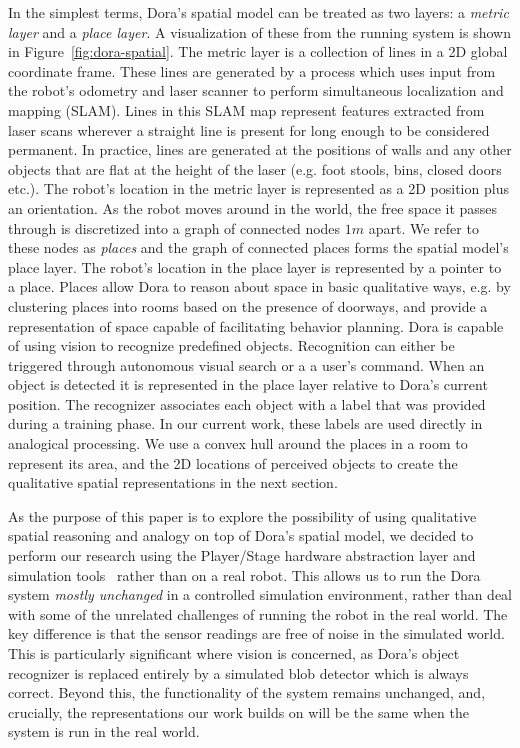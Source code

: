 \documentclass[letterpaper]{article}
\begin{document}
In the simplest terms, Dora's spatial model can be treated as two layers: a \emph{metric layer} and a \emph{place layer}. A visualization of these from the running system is shown in Figure~\ref{fig:dora-spatial}.
The metric layer is a collection of lines in a 2D global coordinate frame. These lines are generated by a  process which uses input from the robot's odometry and laser scanner to perform simultaneous localization and mapping (SLAM). Lines in this SLAM map represent features extracted from laser scans wherever a straight line is present for long enough to be considered permanent. In practice, lines are generated at the positions of walls and any other objects that are flat at the height of the laser (e.g. foot stools, bins, closed doors etc.). The robot's location in the metric layer is represented as a 2D position plus an orientation.
As the robot moves around in the world, the free space it passes through is discretized into a graph of connected nodes $1m$ apart. We refer to these nodes as \emph{places} and the graph of connected places forms the spatial model's place layer. The robot's location in the place layer is represented by a pointer to a place. Places allow Dora to reason about space in basic qualitative ways, e.g. by clustering places into rooms based on the presence of doorways, and provide a representation of space capable of facilitating behavior planning.
Dora is capable of using vision to recognize predefined objects. Recognition can either be triggered through autonomous visual search or a a user's command. When an object is detected it is represented in the place layer relative to Dora's current position. The recognizer associates each object with a label that was provided during a training phase. In our current work, these labels are used directly in analogical processing. We use a convex hull around the places in a room to represent its area, and the 2D locations of perceived objects to create the qualitative spatial representations in the next section.

As the purpose of this paper is to explore the possibility of using qualitative spatial reasoning and analogy on top of Dora's spatial model, we decided to perform our research using the Player/Stage hardware abstraction layer and simulation tools~\cite{GerkeyVaughanHoward03} rather than on a real robot. This allows us to run the Dora system \emph{mostly unchanged} in a controlled simulation environment, rather than deal with some of the unrelated challenges of running the robot in the real world. The key difference is that the sensor readings are free of noise in the simulated world. This is particularly significant where vision is concerned, as Dora's object recognizer is replaced entirely by a simulated blob detector which is always correct. Beyond this, the functionality of the system remains unchanged, and, crucially, the representations our work builds on will be the same when the system is run in the real world.  
\end{document}
